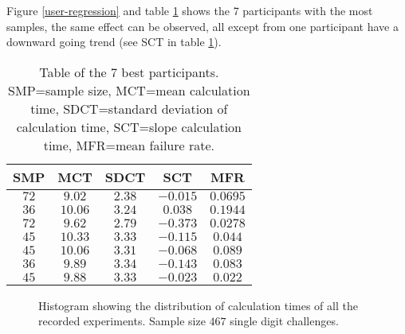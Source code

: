 \par Figure \ref{user-regression} and table \ref{tbl:bestuser} shows the 7 participants with the most samples, the same effect can be observed, all except from one participant have a downward going trend (see SCT in table \ref{tbl:bestuser}).

\begin{table}[h]
    \centering
\begin{tabular}{|c|c|c|c|c|}
    \hline
     SMP & MCT & SDCT & SCT & MFR \\ \hline \hline
    $72$ & $9.02$ & $2.38$ & $-0.015$ & $0.0695$\\\hline
    $36$ & $10.06$ & $3.24$ & $0.038$ & $0.1944$\\\hline
    $72$ & $9.62$ & $2.79$ & $-0.373$ & $0.0278$\\\hline
    $45$ & $10.33$ & $3.33$ & $-0.115$ & $0.044$\\\hline
    $45$ & $10.06$ & $3.31$ & $-0.068$ & $0.089$\\\hline
    $36$ & $9.89$ & $3.34$ & $-0.143$ & $0.083$\\\hline
    $45$ & $9.88$ & $3.33$ & $-0.023$ & $0.022$\\\hline

\end{tabular}
\caption{Table of the 7 best participants. SMP=sample size, MCT=mean calculation time, SDCT=standard deviation of calculation time, SCT=slope calculation time, MFR=mean failure rate. }
\label{tbl:bestuser}
\end{table}


\begin{figure}
    \centering
    \caption{Histogram showing the distribution of calculation times of all the recorded experiments. Sample size $467$ single digit challenges.}
    \label{histo-calctimes}
\end{figure}


